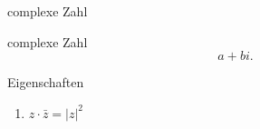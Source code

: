 \documentclass[class=article, crop=false]{standalone}
\begin{document}
\begin{zettel}{complexe Zahl}
\begin{flashcard}{complexe Zahl}
	\[
		a + bi
	.\]
\end{flashcard}
\begin{remark}
	Eigenschaften
	\begin{enumerate}
		\item $z \cdot  \bar{z} =  |z|^2 $

	\end{enumerate}

\end{remark}
\end{zettel}
\end{document}
